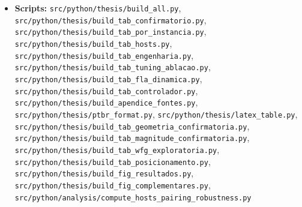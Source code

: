 \begin{itemize}[nosep]
    \item \textbf{Scripts:} \texttt{src/\allowbreak{}python/\allowbreak{}thesis/\allowbreak{}build\_\allowbreak{}all.py}, \texttt{src/\allowbreak{}python/\allowbreak{}thesis/\allowbreak{}build\_\allowbreak{}tab\_\allowbreak{}confirmatorio.py}, \texttt{src/\allowbreak{}python/\allowbreak{}thesis/\allowbreak{}build\_\allowbreak{}tab\_\allowbreak{}por\_\allowbreak{}instancia.py}, \texttt{src/\allowbreak{}python/\allowbreak{}thesis/\allowbreak{}build\_\allowbreak{}tab\_\allowbreak{}hosts.py}, \texttt{src/\allowbreak{}python/\allowbreak{}thesis/\allowbreak{}build\_\allowbreak{}tab\_\allowbreak{}engenharia.py}, \texttt{src/\allowbreak{}python/\allowbreak{}thesis/\allowbreak{}build\_\allowbreak{}tab\_\allowbreak{}tuning\_\allowbreak{}ablacao.py}, \texttt{src/\allowbreak{}python/\allowbreak{}thesis/\allowbreak{}build\_\allowbreak{}tab\_\allowbreak{}fla\_\allowbreak{}dinamica.py}, \texttt{src/\allowbreak{}python/\allowbreak{}thesis/\allowbreak{}build\_\allowbreak{}tab\_\allowbreak{}controlador.py}, \texttt{src/\allowbreak{}python/\allowbreak{}thesis/\allowbreak{}build\_\allowbreak{}apendice\_\allowbreak{}fontes.py}, \texttt{src/\allowbreak{}python/\allowbreak{}thesis/\allowbreak{}ptbr\_\allowbreak{}format.py}, \texttt{src/\allowbreak{}python/\allowbreak{}thesis/\allowbreak{}latex\_\allowbreak{}table.py}, \texttt{src/\allowbreak{}python/\allowbreak{}thesis/\allowbreak{}build\_\allowbreak{}tab\_\allowbreak{}geometria\_\allowbreak{}confirmatoria.py}, \texttt{src/\allowbreak{}python/\allowbreak{}thesis/\allowbreak{}build\_\allowbreak{}tab\_\allowbreak{}magnitude\_\allowbreak{}confirmatoria.py}, \texttt{src/\allowbreak{}python/\allowbreak{}thesis/\allowbreak{}build\_\allowbreak{}tab\_\allowbreak{}wfg\_\allowbreak{}exploratoria.py}, \texttt{src/\allowbreak{}python/\allowbreak{}thesis/\allowbreak{}build\_\allowbreak{}tab\_\allowbreak{}posicionamento.py}, \texttt{src/\allowbreak{}python/\allowbreak{}thesis/\allowbreak{}build\_\allowbreak{}fig\_\allowbreak{}resultados.py}, \texttt{src/\allowbreak{}python/\allowbreak{}thesis/\allowbreak{}build\_\allowbreak{}fig\_\allowbreak{}complementares.py}, \texttt{src/\allowbreak{}python/\allowbreak{}analysis/\allowbreak{}compute\_\allowbreak{}hosts\_\allowbreak{}pairing\_\allowbreak{}robustness.py}

\end{itemize}
